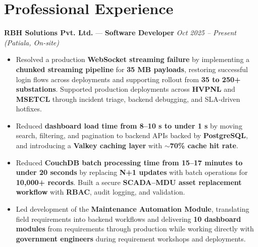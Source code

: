 \documentclass[10pt,a4paper]{article}
\begin{document}
\section*{Professional Experience}
\textbf{RBH Solutions Pvt. Ltd.} — \textbf{Software Developer} \hfill \textit{Oct 2025 -- Present (Patiala, On-site)}
\begin{itemize}[leftmargin=1.2em]

\item Resolved a production \textbf{WebSocket streaming failure} by implementing a \textbf{chunked streaming pipeline} for \textbf{35 MB payloads}, restoring successful login flows across deployments and supporting rollout from \textbf{35 to 250+ substations}. Supported production deployments across \textbf{HVPNL} and \textbf{MSETCL} through incident triage, backend debugging, and SLA-driven hotfixes.

\item Reduced \textbf{dashboard load time from 8--10 s to under 1 s} by moving search, filtering, and pagination to backend APIs backed by \textbf{PostgreSQL}, and introducing a \textbf{Valkey caching layer} with \textbf{$\sim$70\% cache hit rate}.

\item Reduced \textbf{CouchDB batch processing time from 15--17 minutes to under 20 seconds} by replacing \textbf{N+1 updates} with batch operations for \textbf{10,000+ records}. Built a secure \textbf{SCADA--MDU asset replacement workflow} with \textbf{RBAC}, audit logging, and validation.

\item Led development of the \textbf{Maintenance Automation Module}, translating field requirements into backend workflows and delivering \textbf{10 dashboard modules} from requirements through production while working directly with \textbf{government engineers} during requirement workshops and deployments.

\end{itemize}


\vspace{0.4em}
\end{document}
